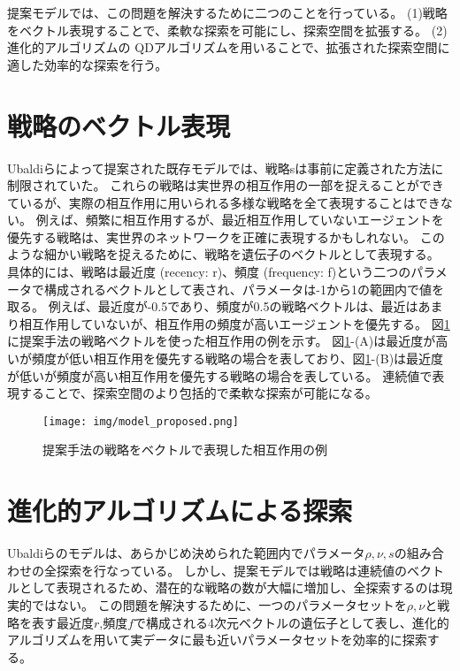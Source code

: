 \documentclass[uplatex,11pt,openany]{ujreport}
\begin{document}
    提案モデルでは、この問題を解決するために二つのことを行っている。
    (1)戦略をベクトル表現することで、柔軟な探索を可能にし、探索空間を拡張する。
    (2)進化的アルゴリズムの QDアルゴリズムを用いることで、拡張された探索空間に適した効率的な探索を行う。

    \section{戦略のベクトル表現}
        Ubaldiらによって提案された既存モデルでは、戦略sは事前に定義された方法に制限されていた。
        これらの戦略は実世界の相互作用の一部を捉えることができているが、実際の相互作用に用いられる多様な戦略を全て表現することはできない。
        例えば、頻繁に相互作用するが、最近相互作用していないエージェントを優先する戦略は、実世界のネットワークを正確に表現するかもしれない。
        このような細かい戦略を捉えるために、戦略を遺伝子のベクトルとして表現する。
        具体的には、戦略は最近度 (recency: r)、頻度 (frequency: f)という二つのパラメータで構成されるベクトルとして表され、パラメータは-1から1の範囲内で値を取る。
        例えば、最近度が-0.5であり、頻度が0.5の戦略ベクトルは、最近はあまり相互作用していないが、相互作用の頻度が高いエージェントを優先する。
        図\ref{fig:strategy}に提案手法の戦略ベクトルを使った相互作用の例を示す。
        図\ref{fig:strategy}-(A)は最近度が高いが頻度が低い相互作用を優先する戦略の場合を表しており、図\ref{fig:strategy}-(B)は最近度が低いが頻度が高い相互作用を優先する戦略の場合を表している。
        連続値で表現することで、探索空間のより包括的で柔軟な探索が可能になる。

        \begin{figure}[htbp]
            \centering
            \texttt{[image: img/model\_proposed.png]}
            \caption{提案手法の戦略をベクトルで表現した相互作用の例}
            \label{fig:strategy}
        \end{figure}

    \section{進化的アルゴリズムによる探索}
        Ubaldiらのモデルは、あらかじめ決められた範囲内でパラメータ$\rho,\nu,s$の組み合わせの全探索を行なっている。
        しかし、提案モデルでは戦略は連続値のベクトルとして表現されるため、潜在的な戦略の数が大幅に増加し、全探索するのは現実的ではない。
        この問題を解決するために、一つのパラメータセットを$\rho,\nu$と戦略を表す最近度$r$,頻度$f$で構成される4次元ベクトルの遺伝子として表し、進化的アルゴリズムを用いて実データに最も近いパラメータセットを効率的に探索する。
\end{document}
